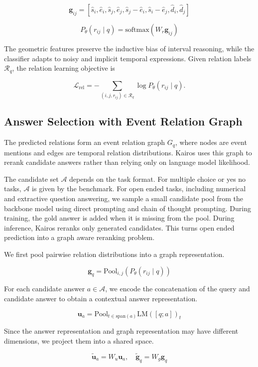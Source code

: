 \documentclass[11pt]{article}
\newcommand{\method}{Kairos}
\begin{document}
$$
\mathbf{g}_{ij}
=
[\hat{s}_i,\hat{e}_i,\hat{s}_j,\hat{e}_j,
\hat{s}_j-\hat{e}_i,
\hat{s}_i-\hat{e}_j,
\hat{d}_i,\hat{d}_j]
$$

$$
P_{\theta}(r_{ij} \mid q) = \mathrm{softmax}(W_r \mathbf{g}_{ij})
$$

The geometric features preserve the inductive bias of interval reasoning, while the classifier adapts to noisy and implicit temporal expressions. Given relation labels \(\mathcal{R}_q\), the relation learning objective is

$$
\mathcal{L}_{\mathrm{rel}}
=
-\sum_{(i,j,r_{ij}) \in \mathcal{R}_q}
\log P_{\theta}(r_{ij} \mid q).
$$

\subsection{Answer Selection with Event Relation Graph}

The predicted relations form an event relation graph \(G_q\), where nodes are event mentions and edges are temporal relation distributions. \method{} uses this graph to rerank candidate answers rather than relying only on language model likelihood.

The candidate set \(\mathcal{A}\) depends on the task format. For multiple choice or yes no tasks, \(\mathcal{A}\) is given by the benchmark. For open ended tasks, including numerical and extractive question answering, we sample a small candidate pool from the backbone model using direct prompting and chain of thought prompting. During training, the gold answer is added when it is missing from the pool. During inference, \method{} reranks only generated candidates. This turns open ended prediction into a graph aware reranking problem.

We first pool pairwise relation distributions into a graph representation.

$$
\mathbf{g}_q = \mathrm{Pool}_{i,j}(P_{\theta}(r_{ij} \mid q))
$$

For each candidate answer \(a \in \mathcal{A}\), we encode the concatenation of the query and candidate answer to obtain a contextual answer representation.

$$
\mathbf{u}_a =
\mathrm{Pool}_{t \in \mathrm{span}(a)}
\mathrm{LM}([q;a])_t
$$

Since the answer representation and graph representation may have different dimensions, we project them into a shared space.

$$
\tilde{\mathbf{u}}_a = W_u \mathbf{u}_a,
\quad
\tilde{\mathbf{g}}_q = W_g \mathbf{g}_q
$$
\end{document}
